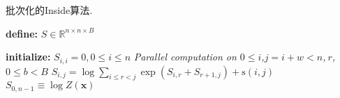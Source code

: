\begin{algorithm}[tb]
	\caption{批次化的Inside算法.}
	\begin{algorithmic}[1]
		\setlength{\commentindent}{.3\textwidth}
		\setlength{\algorithmicindent}{1.5em}
		\renewcommand{\algorithmiccomment}[1]{\unskip\hfill\makebox[\commentindent][l]{$\rhd$~#1}\par}
		\LetLtxMacro{\oldalgorithmic}{\algorithmic}
		\renewcommand{\algorithmic}[1][0]{\oldalgorithmic[#1]%
			\renewcommand{\ALC@com}[1]{\ifnum\pdfstrcmp{##1}{default}=0\else\algorithmiccomment{##1}\fi}}
		\STATE \textbf{define:} $S \in \mathbb{R}^{n \times n \times B}$ 
		
		\STATE \textbf{initialize:} $S_{i, i} = 0,0\leq i\leq n$
		\STATE \emph{Parallel computation on $0 \le i$,$j=i+w<n$,$~r$,$0\le b<B$}
		\STATE $S_{i, j} = \log \sum\limits_{i \le r < j} \exp \left( S_{i, r}+S_{r+1, j} \right)  + \mathrm{s}(i, j) $ \label{line:sum-product}\\
		\ENDFOR
		\RETURN $S_{0, n-1} \equiv \log Z(\boldsymbol{x})$
	\end{algorithmic}
	\label{alg:inside}
\end{algorithm}

